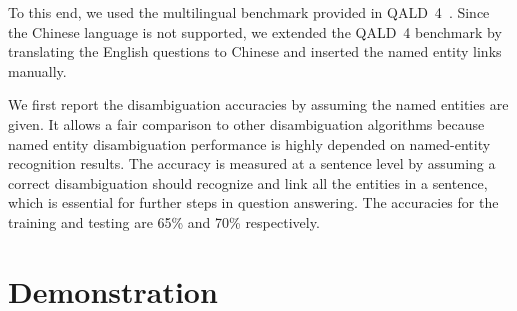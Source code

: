 To this end, we used the multilingual benchmark provided in QALD~4~\cite{qald4}. 
Since the Chinese language is not supported, we extended the QALD~4 benchmark by translating the English questions to Chinese and inserted the named entity links manually.

We first report the disambiguation accuracies by assuming the named entities are given. It allows a fair comparison to other disambiguation algorithms because named entity disambiguation performance is highly depended on named-entity recognition results. The accuracy is measured at a sentence level by assuming a correct disambiguation should recognize and link all the entities in a sentence, which is essential for further steps in question answering. The accuracies for the training and testing are 65\% and 70\% respectively. 



 
\section{Demonstration}
%

